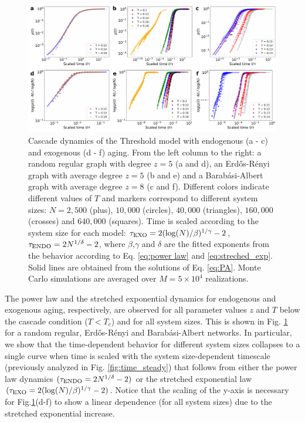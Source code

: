 \begin{figure}
\includegraphics[width=\linewidth]{Figs/Aging_Threshold/FIG_EVO_EXO_ENDO.pdf}
\caption{\label{fig:exo_endo_evo} Cascade dynamics of the Threshold model with endogenous (a - c) and exogenous (d - f) aging. From the left column to the right: a random regular graph with degree $z=5$ (a and d), an Erd\H{o}s-R\'enyi graph with average degree $z = 5$ (b and e) and a Barab\'asi-Albert graph with average degree $z = 8$ (c and f). Different colors indicate different values of $T$ and markers correspond to different system sizes: $N = 2,500$ (plus), $10,000$ (circles), $40,000$ (triangles), $160,000$ (crosses) and $640,000$ (squares). Time is scaled according to the system size for each model: $\tau_{\rm{EXO}} = 2(\log(N)/\beta)^{1/\gamma} - 2$, $\tau_{\rm{ENDO}} = 2N^{1/\delta} - 2$, where $\beta$,$\gamma$ and $\delta$ are the fitted exponents from the behavior according to Eq. \eqref{eq:power law} and \eqref{eq:streched_exp}. Solid lines are obtained from the solutions of Eq. \eqref{eq:PA}. Monte Carlo simulations are averaged over $M = 5 \times 10^4$ realizations.}
\end{figure}

The power law and the stretched exponential dynamics for endogenous and exogenous aging, respectively, are observed for all parameter values $z$ and $T$ below the cascade condition ($T < T_c$) and for all system sizes. This is shown in Fig. \ref{fig:exo_endo_evo} for a random regular, Erd\H{o}s-R\'enyi and  Barab\'asi-Albert networks. In particular, we show that the time-dependent behavior for different system sizes collapses to a single curve when time is scaled with the system size-dependent timescale (previously analyzed in Fig. \ref{fig:time_steady}) that follows from either the power law dynamics $(\tau_{\rm{ENDO}} = 2N^{1/\delta} - 2)$  or the stretched exponential law  $(\tau_{\rm{EXO}} = 2( \log(N)/\beta )^{1/\gamma} - 2)$. Notice that the scaling of the y-axis is necessary for Fig.\ref{fig:exo_endo_evo}(d-f) to show a linear dependence (for all system sizes) due to the stretched exponential increase.

